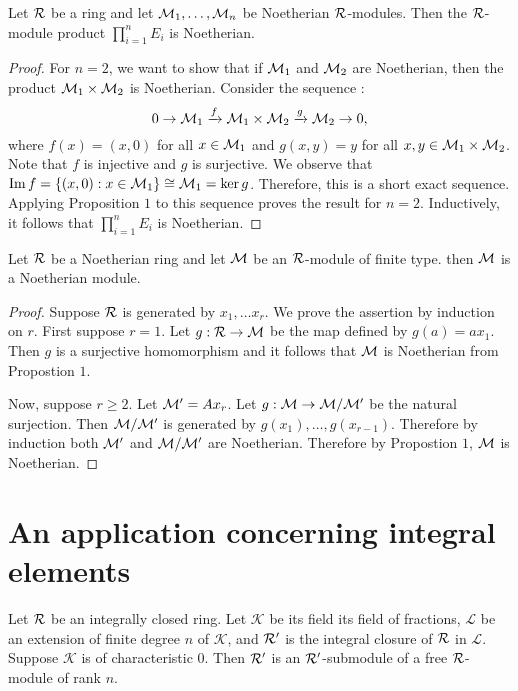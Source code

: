 \begin{corollary}
  Let $\mathcal{R}$ be a ring and let $\mathcal{M}_1, \ldots, \mathcal{M}_n$ be Noetherian $\mathcal{R}$-modules. Then the $\mathcal{R}$-module product $\prod_{i=1}^n E_i$ is Noetherian.
\end{corollary}
\begin{proof}
  For $n=2$, we want to show that if $\mathcal{M}_1$ and $\mathcal{M}_2$ are Noetherian, then the product $\mathcal{M}_1\times \mathcal{M}_2$ is Noetherian. Consider the sequence :
  \[0\rightarrow \mathcal{M}_1 \xrightarrow{f}\mathcal{M}_1\times \mathcal{M}_2 \xrightarrow{g}\mathcal{M}_2 \rightarrow 0,\]where $f(x) = (x,0)$ for all $x\in \mathcal{M}_1$ and $g(x,y)=y$ for all $x,y \in \mathcal{M}_1\times \mathcal{M}_2$. Note that $f$ is injective and $g$ is surjective. We observe that $\operatorname{Im}{f}=\{(x,0):x\in \mathcal{M}_1\}\cong \mathcal{M}_1  = \ker{g}$. Therefore, this is a short exact sequence. Applying Proposition $1$ to this sequence proves the result for $n=2$. Inductively, it follows that $\prod_{i=1}^n E_i$ is Noetherian.
\end{proof}

\begin{corollary}
  Let $\mathcal{R}$ be a Noetherian ring and let $\mathcal{M}$ be an $\mathcal{R}$-module of finite type. then $\mathcal{M}$ is a Noetherian module.
\end{corollary}
\begin{proof}
  Suppose $\mathcal{R}$ is generated by $x_1,\ldots x_r$. We prove the assertion by induction on $r$. First suppose $r=1$. Let $g: \mathcal{R} \to \mathcal{M}$ be the map defined by $g(a)=ax_1$. Then $g$ is a surjective homomorphism and it follows that $\mathcal{M}$ is Noetherian from Propostion $1$.

  Now, suppose $r\geq 2$. Let $\mathcal{M}' = Ax_r$. Let $g:\mathcal{M} \to \mathcal{M}/\mathcal{M}'$ be the natural surjection. Then $\mathcal{M}/\mathcal{M}'$ is generated by $g(x_1),\ldots, g(x_{r-1})$. Therefore by induction both $\mathcal{M}'$ and $\mathcal{M}/\mathcal{M}'$ are Noetherian. Therefore by Propostion $1$, $\mathcal{M}$ is Noetherian.
\end{proof}

\section{An application concerning integral elements}

\begin{lemma}
  Let $\mathcal{R}$ be an integrally closed ring. Let $\mathcal{K}$ be its field its field of fractions, $\mathcal{L}$ be an extension of finite degree $n$ of $\mathcal{K}$, and $\mathcal{R}'$ is the integral closure of $\mathcal{R}$ in $\mathcal{L}$. Suppose $\mathcal{K}$ is of characteristic $0$. Then $\mathcal{R}'$ is an $\mathcal{R}'$-submodule of a free $\mathcal{R}$-module of rank $n$.
\end{lemma}

